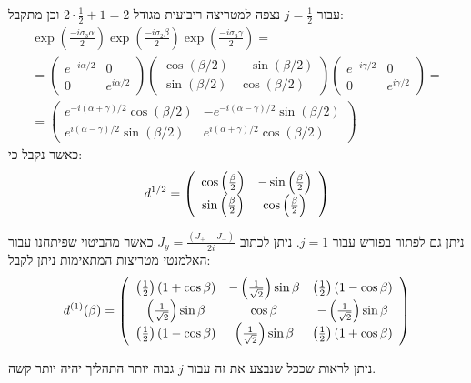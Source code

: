 \documentclass{tstextbook}
\begin{document}
\begin{example}
עבור \(j=\frac{1}{2}\) נצפה למטריצה ריבועית מגודל \(2\cdot \frac{1}{2}+1=2\) וכן מתקבל:
\begin{gather*}\exp\left(\frac{-i\sigma_{3}\alpha}{2}\right)\exp\left(\frac{-i\sigma_{2}\beta}{2}\right)\exp\left(\frac{-i\sigma_{3}\gamma}{2}\right)=\\=\begin{pmatrix}e^{-i\alpha/2}&0\\ 0&e^{i\alpha/2}\end{pmatrix}\begin{pmatrix}\cos\left( \beta/2 \right)&-\sin\left( \beta/2 \right)\\ \sin\left( \beta/2 \right)&\cos\left( \beta/2 \right)\end{pmatrix}\begin{pmatrix}e^{-i\gamma/2}&0\\ 0&e^{i\gamma/2}\end{pmatrix}=\\=\begin{pmatrix}e^{-i\left( \alpha+\gamma \right)/2}\cos\left( \beta/2 \right)&-e^{-i\left( \alpha-\gamma \right)/2}\sin\left( \beta/2 \right)\\ e^{i\left( \alpha-\gamma \right)/2}\sin\left( \beta/2 \right)&e^{i\left( \alpha+\gamma \right)/2}\cos\left( \beta/2 \right)\end{pmatrix} 
\end{gather*}
כאשר נקבל כי:
$$d^{1/2}=\left(\begin{array}{c c}{{\cos\left(\frac{\beta}{2}\right)}}&{{-\sin\left(\frac{\beta}{2}\right)}}\\ {{\sin\left(\frac{\beta}{2}\right)}}&{{\cos\left(\frac{\beta}{2}\right)}}\end{array}\right)$$

\end{example}
\begin{example}
ניתן גם לפתור בפורש עבור \(j=1\). ניתן לכתוב \(J_{y}=\frac{(J_{+}-J_{-})}{2i}\) כאשר מהביטוי שפיתחנו עבור האלמנטי מטריצות המתאימות ניתן לקבל:
$$d^{(1)}(\beta)=\left(\begin{array}{c c c}{{\left(\frac{1}{2}\right)\left(1+\cos\beta\right)}}&{{-\left(\frac{1}{\sqrt{2}}\right)\sin\beta}}&{{\left(\frac{1}{2}\right)\left(1-\cos\beta\right)}}\\  {{\left(\frac{1}{\sqrt{2}}\right)\sin\beta}}&{{\cos\beta}}&{{-\left(\frac{1}{\sqrt{2}}\right)\sin\beta}}\\ {{\left(\frac{1}{2}\right)\left(1-\cos\beta\right)}}&{{\left(\frac{1}{\sqrt{2}}\right)\sin\beta}}&{{\left(\frac{1}{2}\right)\left(1+\cos\beta\right)}}\end{array}\right)$$

\end{example}
ניתן לראות שככל שנבצע את זה עבור \(j\) גבוה יותר התהליך יהיה יותר קשה.
\end{document}
